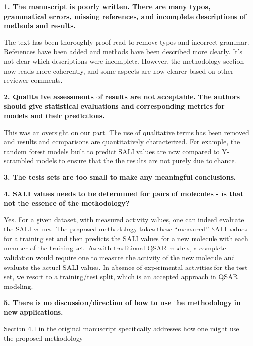 \documentclass[letterpaper, 12pt]{article}
\begin{document}

\textbf{1.  The manuscript is poorly written.  There are many typos, grammatical errors, missing
  references, and incomplete descriptions of methods and results.}

The text has been thoroughly proof read to remove typos and incorrect grammar. References have been
added and methods have been described more clearly. It's not clear which descriptions were
incomplete. However, the methodology section now reads more coherently, and some aspects are now
clearer based on other reviewer comments.

\textbf{2.  Qualitative assessments of results are not acceptable.  The authors should give
  statistical evaluations and corresponding metrics for models and their predictions.}

This was an oversight on our part. The use of qualitative terms has been removed and results and
comparisons are quantitatively characterized. For example, the random forest models built to predict
SALI values are now compared to Y-scrambled models to ensure that the the results are not purely due
to chance.

\textbf{3.  The tests sets are too small to make any meaningful conclusions.}

\textbf{4.  SALI values needs to be determined for pairs of molecules - is that not the essence of
  the methodology?}

Yes. For a given dataset, with measured activity values, one can indeed evaluate the SALI
values. The proposed methodology takes these ``measured'' SALI values for a training set and then
predicts the SALI values for a new molecule with each member of the training set. As with
traditional QSAR models, a complete validation would require one to measure the activity of the new
molecule and evaluate the actual SALI values. In absence of experimental activities for the test
set, we resort to a training/test split, which is an accepted approach in QSAR modeling.

\textbf{5.  There is no discussion/direction of how to use the methodology in new applications.}

Section 4.1 in the original manuscript specifically addresses how one might use the proposed
methodology
\end{document}
